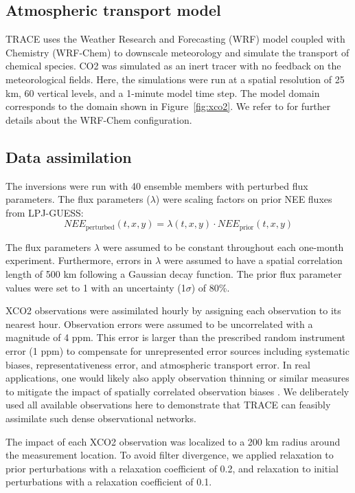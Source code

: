 \documentclass[a4,12pt]{article}
\begin{document}
\subsection{Atmospheric transport model}

TRACE uses the Weather Research and Forecasting (WRF) model coupled with Chemistry (WRF-Chem)
to downscale meteorology and simulate the transport of chemical species.
CO2 was simulated as an inert tracer with no feedback on the meteorological fields.
Here,
the simulations were run at a spatial resolution of 25 km,
60 vertical levels,
and a 1-minute model time step.
The model domain corresponds to the domain shown in Figure~\ref{fig:xco2}.
We refer to \citet{chen2023} for further details about the WRF-Chem configuration.


\subsection{Data assimilation}

The inversions were run with 40 ensemble members with perturbed flux parameters.
The flux parameters ($\lambda$) were scaling factors on prior NEE fluxes from LPJ-GUESS:
\[
    NEE_\text{perturbed}(t, x, y) = \lambda(t, x, y) \cdot NEE _\text{prior}(t, x, y)
\]

The flux parameters $\lambda$ were assumed to be constant throughout each one-month experiment.
Furthermore,
errors in $\lambda$ were assumed to have a spatial correlation length of 500 km following a Gaussian decay function.
The prior flux parameter values were set to 1 with an uncertainty (1$\sigma$) of 80\%.

XCO2 observations were assimilated hourly by assigning each observation to its nearest hour.
Observation errors were assumed to be uncorrelated with a magnitude of 4 ppm.
This error is larger than the prescribed random instrument error (1 ppm) to compensate for unrepresented error sources including
systematic biases,
representativeness error,
and atmospheric transport error.
In real applications,
one would likely also apply observation thinning or similar measures to mitigate the impact of spatially correlated observation biases
\citep[e.g.][]{chevallier2007}.
We deliberately used all available observations here to demonstrate that TRACE can feasibly assimilate such dense observational networks.

The impact of each XCO2 observation was localized to a 200 km radius around the measurement location.
To avoid filter divergence,
we applied relaxation to prior perturbations with a relaxation coefficient of 0.2,
and relaxation to initial perturbations with a relaxation coefficient of 0.1.
\end{document}
